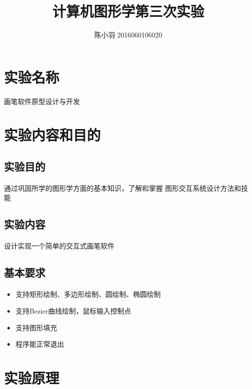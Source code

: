 \documentclass{article}
\title{计算机图形学第三次实验}
\author{陈小羽 2016060106020}
\date{}
\begin{document}
\maketitle

\section{实验名称}
	\paragraph{}
		画笔软件原型设计与开发
\section{实验内容和目的}
	\subsection{实验目的}
		\paragraph{}
			通过巩固所学的图形学方面的基本知识，了解和掌握
			图形交互系统设计方法和技能
	\subsection{实验内容}
		\paragraph{}
			设计实现一个简单的交互式画笔软件
	\subsection{基本要求}
		\paragraph{}
			\begin{itemize}
				\item 支持矩形绘制、多边形绘制、圆绘制、椭圆绘制
				\item 支持Bezier曲线绘制，鼠标输入控制点
				\item 支持图形填充
				\item 程序能正常退出
			\end{itemize}

\section{实验原理}
\end{document}
